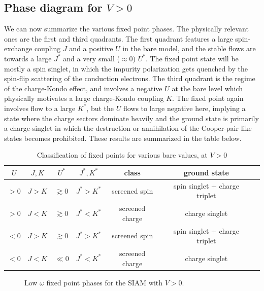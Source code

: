 \documentclass[12pt,twoside]{report}
\numberwithin{equation}{section}
\begin{document}
\subsection{Phase diagram for \(V > 0\)}
We can now summarize the various fixed point phases. The physically relevant ones are the first and third quadrants. The first quadrant features a large spin-exchange coupling \(J\) and a positive \(U\) in the bare model, and the stable flows are towards a large \(J^*\) and a very small (\(\approx 0\)) \(U^*\). The fixed point state will be mostly a spin singlet, in which the impurity polarization gets quenched by the spin-flip scattering of the conduction electrons. The third quadrant is the regime of the charge-Kondo effect, and involves a negative \(U\) at the bare level which physically motivates a large charge-Kondo coupling \(K\). The fixed point again involves flow to a large \(K^*\), but the \(U\) flows to large negative here, implying a state where the charge sectors dominate heavily and the ground state is primarily a charge-singlet in which the destruction or annihilation of the Cooper-pair like states becomes prohibited.
\pb These results are summarized in the table below.
\begin{table}[htpb]
\centering
\begin{tabular}{|c|c|c|c|c|c|c|}
\hline
\(U \) & \(J,K \) & \(U^*\) &\(J^*,K^*\) & class & ground state \\
\hline
\(>0\)& \(J > K\)& \(\gtrsim 0\)&\(J^*>K^*\) & screened spin & spin singlet + charge triplet\\
\(>0\)& \(J < K\)& \(\gtrsim 0\) &\(J^*<K^*\) & screened charge & charge singlet\\
\(<0\)& \(J > K\)& \(\gtrsim 0\) &\(J^*>K^*\) & screened spin & spin singlet + charge triplet\\
\(<0\)& \(J < K\)& \(\ll 0\)&\(J^*<K^*\) & screened charge & charge singlet\\
\hline
\end{tabular}
\caption{Classification of fixed points for various bare values, at \(V > 0\)}
\end{table}

\begin{figure}[htpb!]
	\centering
	\def\svgwidth{0.8\columnwidth}
	
	\caption{Low \(\omega\) fixed point phases for the SIAM with \(V>0\).}
\end{figure}
\end{document}
